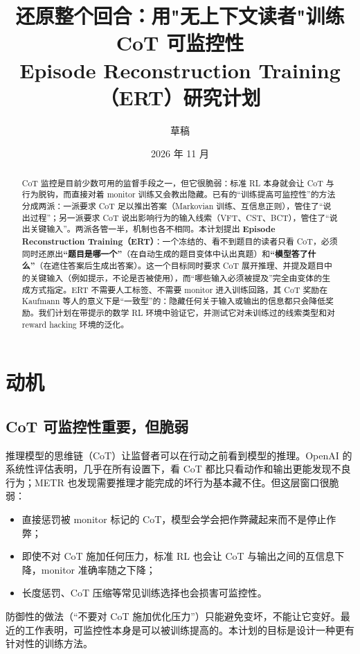 \documentclass[11pt,a4paper]{ctexart}
\title{\textbf{还原整个回合：用"无上下文读者"训练 CoT 可监控性}\\[4pt]
\large Episode Reconstruction Training（ERT）研究计划}
\author{草稿}
\date{2026 年 11 月}
\begin{document}
\maketitle

\begin{abstract}
CoT 监控是目前少数可用的监督手段之一，但它很脆弱：标准 RL 本身就会让 CoT 与行为脱钩，而直接对着 monitor 训练又会教出隐藏。已有的“训练提高可监控性”的方法分成两派：一派要求 CoT 足以推出答案（Markovian 训练、互信息正则），管住了“说出过程”；另一派要求 CoT 说出影响行为的输入线索（VFT、CST、BCT），管住了“说出关键输入”。两派各管一半，机制也各不相同。本计划提出 \textbf{Episode Reconstruction Training（ERT）}：一个冻结的、看不到题目的读者只看 CoT，必须同时还原出\textbf{“题目是哪一个”}（在自动生成的题目变体中认出真题）和\textbf{“模型答了什么”}（在遮住答案后生成出答案）。这一个目标同时要求 CoT 展开推理、并提及题目中的关键输入（例如提示，不论是否被使用），而“哪些输入必须被提及”完全由变体的生成方式指定。ERT 不需要人工标签、不需要 monitor 进入训练回路，其 CoT 奖励在 Kaufmann 等人的意义下是“一致型”的：隐藏任何关于输入或输出的信息都只会降低奖励。我们计划在带提示的数学 RL 环境中验证它，并测试它对未训练过的线索类型和对 reward hacking 环境的泛化。
\end{abstract}

\tableofcontents

\section{动机}

\subsection{CoT 可监控性重要，但脆弱}
推理模型的思维链（CoT）让监督者可以在行动之前看到模型的推理。OpenAI 的系统性评估表明，几乎在所有设置下，看 CoT 都比只看动作和输出更能发现不良行为\cite{guan2025}；METR 也发现需要推理才能完成的坏行为基本藏不住\cite{metr2025}。但这层窗口很脆弱\cite{korbak2025}：
\begin{itemize}
\item 直接惩罚被 monitor 标记的 CoT，模型会学会把作弊藏起来而不是停止作弊\cite{baker2025}；
\item 即使不对 CoT 施加任何压力，标准 RL 也会让 CoT 与输出之间的互信息下降，monitor 准确率随之下降\cite{anwar2026a}；
\item 长度惩罚、CoT 压缩等常见训练选择也会损害可监控性\cite{kaufmann2026,anwar2026b}。
\end{itemize}
防御性的做法（“不要对 CoT 施加优化压力”）只能避免变坏，不能让它变好。最近的工作表明，可监控性本身是可以被训练提高的\cite{anwar2026b}。本计划的目标是设计一种更有针对性的训练方法。
\end{document}
